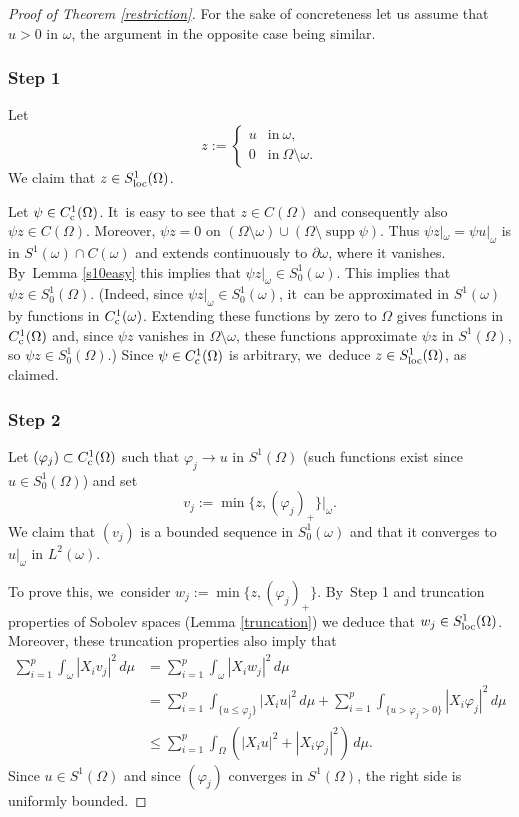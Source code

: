 \documentclass[JEP,XML,SOM,Unicode,published]{cedram}
\newcommand{\rc}{\textup{c}}
\newcommand{\loc}{\textup{loc}}
\theoremstyle{definition}
\let\phi\varphi
\newcommand{\1}{\mathbbm{1}}
\DeclareMathOperator{\supp}{supp}
\begin{document}
\begin{proof}[Proof of Theorem \ref{restriction}]
For the sake of concreteness let us assume that $u> 0$ in $\omega$, the argument in the opposite case being similar.

\subsubsection*{Step 1} Let
\[
z:= \begin{cases} u & \text{in}\ \omega,\\ 0 & \text{in}\ \Omega\setminus\omega. \end{cases}
\]
We claim that $z\in S^1_\loc(\Omega)$.

Let $\psi\in C^1_\rc(\Omega)$. It~is easy to see that $z\in C(\Omega)$ and consequently also $\psi z\in C(\Omega)$. Moreover, $\psi z=0$ on $(\Omega\setminus\omega)\cup(\Omega\setminus\supp\psi)$. Thus $\psi z|_\omega = \psi u|_\omega$ is in $S^1(\omega)\cap C(\omega)$ and extends continuously to $\partial\omega$, where it vanishes. By~Lemma \ref{s10easy} this implies that $\psi z|_\omega \in S^1_0(\omega)$. This implies that $\psi z\in S^1_0(\Omega)$. (Indeed, since $\psi z|_\omega\in S^1_0(\omega)$, it~can be approximated in $S^1(\omega)$ by functions in $C^1_\rc(\omega)$. Extending these functions by zero to $\Omega$ gives functions in $C^1_\rc(\Omega)$ and, since $\psi z$ vanishes in $\Omega\setminus\omega$, these functions approximate $\psi z$ in $S^1(\Omega)$, so $\psi z\in S^1_0(\Omega)$.) Since $\psi\in C^1_\rc(\Omega)$ is arbitrary, we~deduce $z\in S^1_\loc(\Omega)$, as claimed.

\subsubsection*{Step 2} Let $(\phi_j)\subset C^1_\rc(\Omega)$ such that $\phi_j\to u$ in $S^1(\Omega)$ (such functions exist since $u\in S^1_0(\Omega)$) and set
\[
v_j := \min\{ z, (\phi_j)_+ \}|_\omega.
\]
We claim that $(v_j)$ is a bounded sequence in $S^1_0(\omega)$ and that it converges to $u|_\omega$ in $L^2(\omega)$.

To prove this, we~consider $w_j:=\min\{ z, (\phi_j)_+ \}$. By~Step 1 and truncation properties of Sobolev spaces (Lemma \ref{truncation}) we deduce that $w_j\in S^1_\loc(\Omega)$. Moreover, these truncation properties also imply that
\begin{align*}
\sum_{i=1}^p \int_\omega |X_i v_j|^2\,d\mu & = \sum_{i=1}^p \int_\omega |X_i w_j|^2\,d\mu \\
& = \sum_{i=1}^p \int_{\{u \leq \phi_j \}} |X_i u|^2\,d\mu + \sum_{i=1}^p \int_{\{ u> \phi_j >0 \}} |X_i \phi_j|^2\,d\mu \\
& \leq \sum_{i=1}^p \int_\Omega (|X_i u|^2 + |X_i \phi_j|^2)\,d\mu.
\end{align*}
Since $u\in S^1(\Omega)$ and since $(\phi_j)$ converges in $S^1(\Omega)$, the right side is uniformly bounded.


\end{proof}
\end{document}
